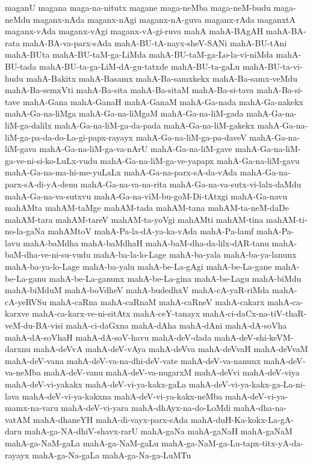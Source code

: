 {maganU
magana
maga-na-nitutx
magane
maga-neMba
maga-neM-budu
maga-neMdu
maganx-nAda
maganx-nAgi
maganx-nA-guva
maganx-rAda
maganxtA
maganx-vAda
maganx-vAgi
maganx-vA-gi-ruva
mahA
mahA-BAgAH
mahA-BA-rata
mahA-BA-va-parx-sAda
mahA-BU-tA-nayx-sheV-SANi
mahA-BU-tAni
mahA-BUta
mahA-BU-taM-ga-LiMda
mahA-BU-taM-ga-Lo-la-vi-niMda
mahA-BU-tada
mahA-BU-ta-ga-LiM-dA-gu-tatxde
mahA-BU-ta-gaLu
mahA-BU-ta-vi-hudu
mahA-Bakitx
mahA-Basamx
mahA-Ba-samxkekx
mahA-Ba-samx-veMdu
mahA-Ba-semxVti
mahA-Ba-sita
mahA-Ba-sitaM
mahA-Ba-si-tava
mahA-Ba-si-tave
mahA-Gana
mahA-GanaH
mahA-GanaM
mahA-Ga-nada
mahA-Ga-nakekx
mahA-Ga-na-liMga
mahA-Ga-na-liMgaM
mahA-Ga-na-liM-gada
mahA-Ga-na-liM-ga-dalilx
mahA-Ga-na-liM-ga-da-pada
mahA-Ga-na-liM-gakekx
mahA-Ga-na-liM-ga-pa-da-do-La-gi-papx-rayayx
mahA-Ga-na-liM-ga-pa-daveV
mahA-Ga-na-liM-gava
mahA-Ga-na-liM-ga-va-nArU
mahA-Ga-na-liM-gave
mahA-Ga-na-liM-ga-ve-ni-si-ko-LuLx-vudu
mahA-Ga-na-liM-ga-ve-yapapx
mahA-Ga-na-liM-gavu
mahA-Ga-na-ma-hi-me-yuLaLx
mahA-Ga-na-parx-sA-da-vAda
mahA-Ga-na-parx-sA-di-yA-denu
mahA-Ga-na-va-na-rita
mahA-Ga-na-va-sutx-vi-lalx-daMdu
mahA-Ga-na-va-sutxvu
mahA-Ga-na-viM-bu-goM-Di-tAtxgi
mahA-Ga-navu
mahAMta
mahAM-taMge
mahAM-tada
mahAM-tana
mahAM-ta-neM-daDe
mahAM-tara
mahAM-tareV
mahAM-ta-yoVgi
mahAMti
mahAM-tina
mahAM-ti-no-la-gaNa
mahAMtoV
mahA-Pa-la-dA-ya-ka-vAda
mahA-Pa-lamf
mahA-Pa-lavu
mahA-baMdha
mahA-baMdhaH
mahA-baM-dha-da-lilx-dAR-tanu
mahA-baM-dha-ve-ni-su-vudu
mahA-ba-la-lo-Lage
mahA-ba-yala
mahA-ba-ya-lanunx
mahA-ba-ya-lo-Lage
mahA-ba-yalu
mahA-be-La-gAgi
mahA-be-La-gane
mahA-be-La-ganu
mahA-be-La-ganunx
mahA-be-La-gina
mahA-be-Lagu
mahA-biMdu
mahA-biMduM
mahA-boVdheV
mahA-budedhxV
mahA-cA-yaR-riMda
mahA-cA-yeRVSu
mahA-caRna
mahA-caRnaM
mahA-caRneV
mahA-cakarx
mahA-ca-karxve
mahA-ca-karx-ve-ni-sitAtx
mahA-ceY-tanayx
mahA-ci-daCx-na-tiV-thaR-veM-du-BA-visi
mahA-ci-daGxna
mahA-dAha
mahA-dAni
mahA-dA-soVha
mahA-dA-soVhaH
mahA-dA-soV-havu
mahA-deV-dada
mahA-deV-shi-keVM-darxnu
mahA-deVvA
mahA-deV-vAya
mahA-deVva
mahA-deVvaH
mahA-deVvaM
mahA-deV-vana
mahA-deV-va-na-dhi-deV-vate
mahA-deV-va-nanunx
mahA-deV-va-neMba
mahA-deV-vanu
mahA-deV-va-nugarxM
mahA-deVvi
mahA-deV-viya
mahA-deV-vi-yakakx
mahA-deV-vi-ya-kakx-gaLa
mahA-deV-vi-ya-kakx-ga-La-ni-lava
mahA-deV-vi-ya-kakxna
mahA-deV-vi-ya-kakx-neMba
mahA-deV-vi-ya-mamx-na-varu
mahA-deV-vi-yara
mahA-dhAyx-na-do-LoMdi
mahA-dha-na-vatAM
mahA-dhaneYH
mahA-di-vayx-parx-sAda
mahA-duH-Ka-kokx-La-gA-daru
mahA-ga-NA-dhiV-shavx-rarU
mahA-gaNa
mahA-gaNaH
mahA-gaNaM
mahA-ga-NaM-gaLa
mahA-ga-NaM-gaLu
mahA-ga-NaM-ga-Lu-tapx-titx-yA-da-rayayx
mahA-ga-Na-gaLa
mahA-ga-Na-ga-LuMTu
}
